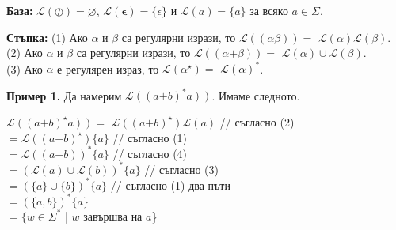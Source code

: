 \documentclass{article}
\newcommand{\bleft}{
    \boldsymbol{\left(\right.}
}
\newcommand{\bright}{
    \boldsymbol{\left.\right)}
}
\newcommand{\bplus}{
    \boldsymbol{+}
}
\newcommand{\bepsilon}{
    \boldsymbol{\epsilon}
}
\begin{document}
    \vspace{10pt}

    \textbf{База:} $\mathscr{L}(\oslash) = \varnothing$, $\mathscr{L}(\bepsilon) = \{\epsilon\}$ и $\mathscr{L}(a) = \{a\}$ за всяко $a \in \Sigma$. \\
    
    \vspace{5pt}
    
    \textbf{Стъпка:} (1) Ако $\alpha$ и $\beta$ са регулярни изрази, то $\mathscr{L}(\bleft \alpha \beta \bright) =$
    $\mathscr{L}(\alpha)\mathscr{L}(\beta)$. \\
    (2) Ако $\alpha$ и $\beta$ са регулярни изрази, то $\mathscr{L}(\bleft \alpha \bplus \beta \bright) =$
    $\mathscr{L}(\alpha) \cup \mathscr{L}(\beta)$. \\
    (3) Ако $\alpha$ е регулярен израз, то $\mathscr{L}(\alpha^\star) =$
    $\mathscr{L}(\alpha)^*$. 

    \vspace{15pt}
    
    \textbf{Пример 1.} Да намерим $\mathscr{L}(\bleft a \bplus b \bright ^* a \bright)$. Имаме следното. \\
    \begin{center}
        $\mathscr{L}(\bleft a \bplus b \bright ^\star a \bright) = $
        $\mathscr{L}(\bleft a \bplus b \bright ^\star) \mathscr{L}(a)$ \hspace{10pt} // съгласно (2) \\
        \hspace{62pt}$=\mathscr{L}(\bleft a \bplus b \bright ^\star)\{a\}$ \hspace{10pt} // съгласно (1) \\
        \hspace{62pt}$=\mathscr{L}(\bleft a \bplus b \bright )^*\{a\}$ \hspace{10pt} // съгласно (4) \\
        \hspace{76pt}$=(\mathscr{L}(a) \cup \mathscr{L}(b))^*\{a\}$ \hspace{10pt} // съгласно (3) \\
        \hspace{104pt}$=(\{a\} \cup \{b\})^*\{a\}$ \hspace{10pt} // съгласно (1) два пъти \\
        \hspace{-44pt}$=(\{a,b\})^*\{a\}$ \\
        \hspace{33pt}$=\{w \in \Sigma^*$ | $w$ завършва на $a$\}
    \end{center}
\end{document}
